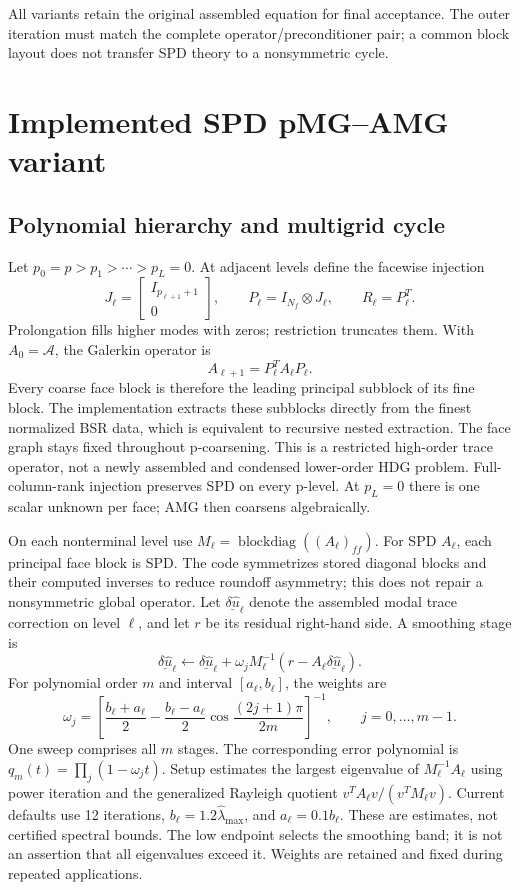 \documentclass[11pt]{article}
\numberwithin{equation}{section}
\numberwithin{figure}{section}
\numberwithin{table}{section}
\begin{document}
All variants retain the original assembled equation for final acceptance.
The outer iteration must match the complete operator/preconditioner pair;
a common block layout does not transfer SPD theory to a nonsymmetric cycle.

\section{Implemented SPD pMG--AMG variant}\label{sec:spd}
\subsection{Polynomial hierarchy and multigrid cycle}
Let $p_0=p>p_1>\cdots>p_L=0$. At adjacent levels define the facewise injection
\[
 J_\ell=\begin{bmatrix}I_{p_{\ell+1}+1}\\0\end{bmatrix},\qquad
 P_\ell=I_{N_f}\otimes J_\ell,\qquad R_\ell=P_\ell^T.
\]
Prolongation fills higher modes with zeros; restriction truncates them.
With $A_0=\mathcal A$, the Galerkin operator is
\[
 A_{\ell+1}=P_\ell^T A_\ell P_\ell.
\]
Every coarse face block is therefore the leading principal subblock of its
fine block. The implementation extracts these subblocks directly from the
finest normalized BSR data, which is equivalent to recursive nested extraction.
The face graph stays fixed throughout p-coarsening. This is a restricted
high-order trace operator, not a newly assembled and condensed lower-order HDG
problem. Full-column-rank injection preserves SPD on every p-level.
At $p_L=0$ there is one scalar unknown per face; AMG then coarsens algebraically.

On each nonterminal level use $M_\ell=\operatorname{blockdiag}((A_\ell)_{ff})$.
For SPD $A_\ell$, each principal face block is SPD. The code symmetrizes stored
diagonal blocks and their computed inverses to reduce roundoff asymmetry;
this does not repair a nonsymmetric global operator.
Let $\underline{\delta\widehat{u}}_\ell$ denote the assembled modal trace
correction on level $\ell$, and let $r$ be its residual right-hand side.
A smoothing stage is
\[
 \underline{\delta\widehat{u}}_\ell
 \leftarrow\underline{\delta\widehat{u}}_\ell
 +\omega_j M_\ell^{-1}
 (r-A_\ell\underline{\delta\widehat{u}}_\ell).
\]
For polynomial order $m$ and interval $[a_\ell,b_\ell]$, the weights are
\[
 \omega_j=\left[\frac{b_\ell+a_\ell}{2}
 -\frac{b_\ell-a_\ell}{2}\cos\frac{(2j+1)\pi}{2m}\right]^{-1},
 \qquad j=0,\ldots,m-1.
\]
One sweep comprises all $m$ stages. The corresponding error polynomial is
$q_m(t)=\prod_j(1-\omega_jt)$. Setup estimates the largest eigenvalue of
$M_\ell^{-1}A_\ell$ using power iteration and the generalized Rayleigh quotient
$v^TA_\ell v/(v^TM_\ell v)$. Current defaults use 12 iterations,
$b_\ell=1.2\widehat\lambda_{\max}$, and $a_\ell=0.1b_\ell$.
These are estimates, not certified spectral bounds. The low endpoint selects
the smoothing band; it is not an assertion that all eigenvalues exceed it.
Weights are retained and fixed during repeated applications.
\end{document}
